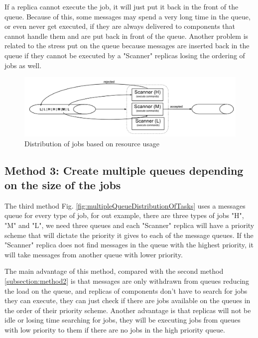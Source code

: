 If a replica cannot execute the job, it will just put it back in the front of the queue. Because of this, some messages may spend a very long time in the queue, or even never get executed, if they are always delivered to components that cannot handle them and are put back in front of the queue. Another problem is related to the stress put on the queue  because messages are inserted back in the queue if they cannot be executed by a "Scanner" replicas losing the ordering of jobs as well.

\begin{figure}[ht]
\centering
\includegraphics[width=\linewidth]{./img/2_PriorityLoadBalancing.png}
\caption{Distribution of jobs based on resource usage}
\label{fig:sizeBaseDistributionOftasks}
\end{figure}


\subsection{Method 3: Create multiple queues depending on the size of the jobs}
\label{subsection:method3}
The third method Fig. \ref{fig:multipleQueueDistributionOfTasks} uses a messages queue for every type of job, for out example, there are three types of jobs "H", "M" and "L", we need three queues and each "Scanner" replica will have a priority scheme that will dictate the priority it gives to each of the message queues. If the "Scanner" replica does not find messages in the queue with the highest priority, it will take messages from another queue with lower priority. 

The main advantage of this method, compared with the second method \ref{subsection:method2} is that messages are only withdrawn from queues reducing the load on the queue, and replicas of components don't have to search for jobs they can execute, they can just check if there are jobs available on the queues in the order of their priority scheme. Another advantage is that replicas will not be idle or losing time searching for jobs, they will be executing jobs from queues with low priority to them if there are no jobs in the high priority queue.

